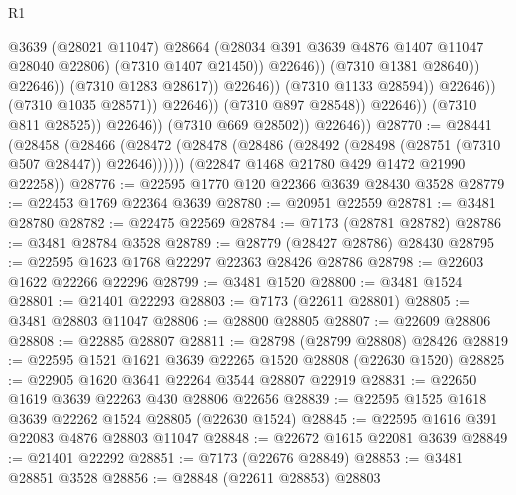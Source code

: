 \begin{lexlean}{R1}
\begin{coremodule}
                                                    @3639
                                                    (@28021 @11047)
                                                    @28664
                                                    (@28034
                                                      @391
                                                      @3639
                                                      @4876
                                                      @1407
                                                      @11047
                                                      @28040
                                                      @22806)
                                                    (@7310 @1407 @21450))
                                                  @22646))
                                              (@7310 @1381 @28640))
                                            @22646))
                                        (@7310 @1283 @28617))
                                      @22646))
                                  (@7310 @1133 @28594))
                                @22646))
                            (@7310 @1035 @28571))
                          @22646))
                      (@7310 @897 @28548))
                    @22646))
                (@7310 @811 @28525))
              @22646))
          (@7310 @669 @28502))
        @22646))
@28770 := @28441
    (@28458
      (@28466 (@28472 (@28478 (@28486 (@28492 (@28498 (@28751 (@7310 @507 @28447)) @22646))))))
      (@22847 @1468 @21780 @429 @1472 @21990 @22258))
@28776 := @22595 @1770 @120 @22366 @3639 @28430 @3528
@28779 := @22453 @1769 @22364 @3639
@28780 := @20951 @22559
@28781 := @3481 @28780
@28782 := @22475 @22569
@28784 := @7173 (@28781 @28782)
@28786 := @3481 @28784 @3528
@28789 := @28779 (@28427 @28786) @28430
@28795 := @22595 @1623 @1768 @22297 @22363 @28426 @28786
@28798 := @22603 @1622 @22266 @22296
@28799 := @3481 @1520
@28800 := @3481 @1524
@28801 := @21401 @22293
@28803 := @7173 (@22611 @28801)
@28805 := @3481 @28803 @11047
@28806 := @28800 @28805
@28807 := @22609 @28806
@28808 := @22885 @28807
@28811 := @28798 (@28799 @28808) @28426
@28819 := @22595 @1521 @1621 @3639 @22265 @1520 @28808 (@22630 @1520)
@28825 := @22905 @1620 @3641 @22264 @3544 @28807 @22919
@28831 := @22650 @1619 @3639 @22263 @430 @28806 @22656
@28839 := @22595 @1525 @1618 @3639 @22262 @1524 @28805 (@22630 @1524)
@28845 := @22595 @1616 @391 @22083 @4876 @28803 @11047
@28848 := @22672 @1615 @22081 @3639
@28849 := @21401 @22292
@28851 := @7173 (@22676 @28849)
@28853 := @3481 @28851 @3528
@28856 := @28848 (@22611 @28853) @28803

\end{coremodule}
\end{lexlean}
